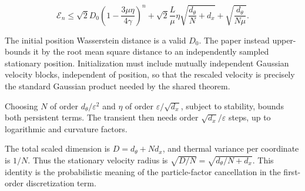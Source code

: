 \documentclass[11pt,a4paper]{article}
\begin{document}
\[\mathcal E_n\le\sqrt2D_0
\left(1-\frac{3\mu\eta}{4\gamma}\right)^n
+\sqrt2\frac L\mu\eta\sqrt{\frac{d_\theta}N+d_x}
+\sqrt{\frac{d_\theta}{N\mu}}.\]


The initial position Wasserstein distance is a valid \(D_0\).
The paper instead upper-bounds it by the root mean square distance to an
independently sampled stationary position. Initialization must include mutually
independent Gaussian velocity blocks, independent of position, so that the
rescaled velocity is precisely the standard Gaussian product needed by the
shared theorem.




Choosing \(N\) of order \(d_\theta/\varepsilon^2\) and \(\eta\) of
order \(\varepsilon/\sqrt{d_x}\), subject to stability, bounds both persistent terms. The transient then needs order \(\sqrt{d_x}/\varepsilon\) steps,
up to logarithmic and curvature factors.



The total scaled dimension is \(D=d_\theta+Nd_x\), and thermal variance per coordinate is \(1/N\). Thus the stationary velocity radius is \(\sqrt{D/N}=\sqrt{d_\theta/N+d_x}\). This identity is the probabilistic meaning of the particle-factor cancellation in the first-order discretization term.
\end{document}
